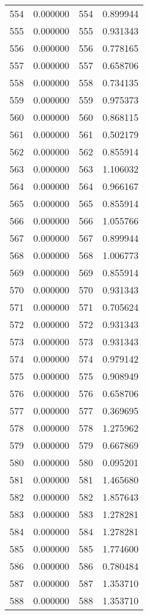 \documentclass[12pt]{article}
\begin{document}
\begin{longtable}{@{}cccc@{}}
554 & 0.000000 & 554 & 0.899944 \\
555 & 0.000000 & 555 & 0.931343 \\
556 & 0.000000 & 556 & 0.778165 \\
557 & 0.000000 & 557 & 0.658706 \\
558 & 0.000000 & 558 & 0.734135 \\
559 & 0.000000 & 559 & 0.975373 \\
560 & 0.000000 & 560 & 0.868115 \\
561 & 0.000000 & 561 & 0.502179 \\
562 & 0.000000 & 562 & 0.855914 \\
563 & 0.000000 & 563 & 1.106032 \\
564 & 0.000000 & 564 & 0.966167 \\
565 & 0.000000 & 565 & 0.855914 \\
566 & 0.000000 & 566 & 1.055766 \\
567 & 0.000000 & 567 & 0.899944 \\
568 & 0.000000 & 568 & 1.006773 \\
569 & 0.000000 & 569 & 0.855914 \\
570 & 0.000000 & 570 & 0.931343 \\
571 & 0.000000 & 571 & 0.705624 \\
572 & 0.000000 & 572 & 0.931343 \\
573 & 0.000000 & 573 & 0.931343 \\
574 & 0.000000 & 574 & 0.979142 \\
575 & 0.000000 & 575 & 0.908949 \\
576 & 0.000000 & 576 & 0.658706 \\
577 & 0.000000 & 577 & 0.369695 \\
578 & 0.000000 & 578 & 1.275962 \\
579 & 0.000000 & 579 & 0.667869 \\
580 & 0.000000 & 580 & 0.095201 \\
581 & 0.000000 & 581 & 1.465680 \\
582 & 0.000000 & 582 & 1.857643 \\
583 & 0.000000 & 583 & 1.278281 \\
584 & 0.000000 & 584 & 1.278281 \\
585 & 0.000000 & 585 & 1.774600 \\
586 & 0.000000 & 586 & 0.780484 \\
587 & 0.000000 & 587 & 1.353710 \\
588 & 0.000000 & 588 & 1.353710 \\

\end{longtable}
\end{document}
